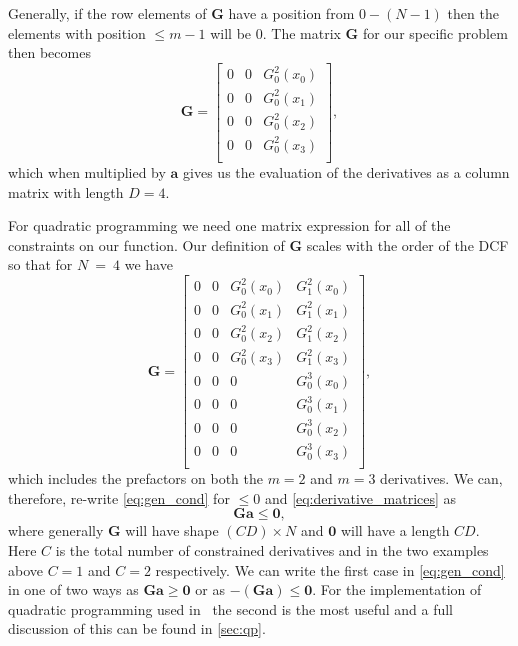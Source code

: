 Generally, if the row elements of $\mathbf{G}$ have a position from $0 - (N-1)$ then the elements with position $\leq m - 1$ will be $0$. The matrix $\mathbf{G}$ for our specific problem then becomes
\begin{equation}
    \mathbf{G} =
    \begin{bmatrix}
    0 & 0 & G_0^2(x_0) \\
    0 & 0 & G_0^2(x_1) \\
    0 & 0 & G_0^2(x_2) \\
    0 & 0 & G_0^2(x_3) \\
    \end{bmatrix},
\end{equation}
which when multiplied by $\mathbf{a}$ gives us the evaluation of the derivatives as a column matrix with length $D = 4$.

For quadratic programming we need one matrix expression for all of the constraints on our function. Our definition of $\mathbf{G}$ scales with the order of the DCF so that for $N~=~4$ we have
\begin{equation}
    \mathbf{G} =
    \begin{bmatrix}
    0 & 0 & G_0^2(x_0) & G_1^2(x_0)\\
    0 & 0 & G_0^2(x_1) & G_1^2(x_1)\\
    0 & 0 & G_0^2(x_2) & G_1^2(x_2)\\
    0 & 0 & G_0^2(x_3) & G_1^2(x_3)\\
    0 & 0 & 0 & G_0^3(x_0)\\
    0 & 0 & 0 & G_0^3(x_1)\\
    0 & 0 & 0 & G_0^3(x_2)\\
    0 & 0 & 0 & G_0^3(x_3)\\
    \end{bmatrix},
    \label{eq:example_G}
\end{equation}
which includes the prefactors on both the $m = 2$ and $m = 3$ derivatives. We can, therefore, re-write \cref{eq:gen_cond} for $\leq 0$ and \cref{eq:derivative_matrices} as
\begin{equation}
    \mathbf{Ga} \leq \mathbf{0},
    \label{eq:cvx_const}
\end{equation}
where generally $\mathbf{G}$ will have shape $(CD) \times N$ and $\mathbf{0}$ will have a length $CD$. Here $C$ is the total number of constrained derivatives and in the two examples above $C = 1$ and $C = 2$ respectively. We can write the first case in \cref{eq:gen_cond} in one of two ways as $\mathbf{Ga} \geq \mathbf{0}$ or as $-(\mathbf{Ga}) \leq \mathbf{0}$. For the implementation of quadratic programming used in \maxsmooth~the second is the most useful and a full discussion of this can be found in \cref{sec:qp}.

